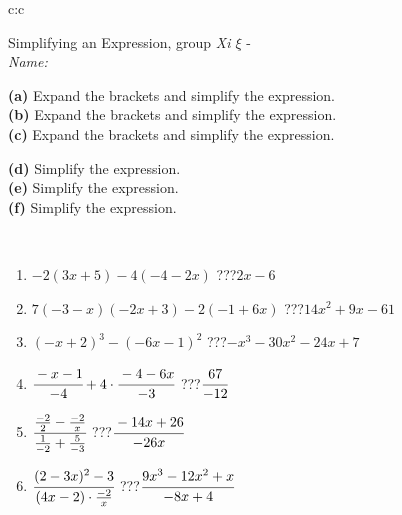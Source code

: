 \documentclass[10pt]{report}
\begin{document}
\newpage
\thispagestyle{empty}
\begin{tabular}{c:c}
\begin{minipage}[c][104.5mm][t]{0.5\linewidth}
\begin{center}
\vspace{7mm}
{\huge Simplifying an Expression, group \textit{Xi $\xi$} -}\\[5mm]
\textit{Name:}\phantom{xxxxxxxxxxxxxxxxxxxxxxxxxxxxxxxxxxxxxxxxxxxxxxxxxxxxxxxxxxxxxxxxx}\\[5mm]
\begin{minipage}{0.95\linewidth}
\begin{center}
{\small \begin{minipage}{0.6\textwidth}
\textbf{(a)} Expand the brackets and simplify the expression. \\[1mm]
\textbf{(b)} Expand the brackets and simplify the expression. \\[1mm]
\textbf{(c)} Expand the brackets and simplify the expression.
\end{minipage} \begin{minipage}{0.39\textwidth}
\textbf{(d)} Simplify the expression. \\[1mm]
\textbf{(e)} Simplify the expression. \\[1mm]
\textbf{(f)} Simplify the expression.
\end{minipage}
}
\end{center}
\end{minipage}
\\[4mm]
\begin{minipage}{0.79\linewidth}
\begin{center}
\begin{varwidth}{\linewidth}
\begin{enumerate}
\normalsize
\item $-2(3x+5)-4(-4-2x)$\quad \dotfill\; ???\;\dotfill \quad $2x-6$
\item $7(-3-x)(-2x+3)-2(-1+6x)$\quad \dotfill\; ???\;\dotfill \quad $14x^2+9x-61$
\item $(-x+2)^3-(-6x-1)^2$\quad \dotfill\; ???\;\dotfill \quad $-x^3-30x^2-24x+7$
\item $\cfrac{-x-1}{-4}+4\cdot\cfrac{-4-6x}{-3}$\quad \dotfill\; ???\;\dotfill \quad $\cfrac{67}{-12}$
\item $\cfrac{\frac{-2}{2}-\frac{-2}{x}}{\frac{1}{-2}+\frac{5}{-3}}$\quad \dotfill\; ???\;\dotfill \quad $\cfrac{-14x+26}{-26x}$
\item $\cfrac{(2-3x)^2-3}{(4x-2)\cdot\frac{-2}{x}}$\quad \dotfill\; ???\;\dotfill \quad $\cfrac{9x^3-12x^2+x}{-8x+4}$

\end{enumerate}
\end{varwidth}
\end{center}
\end{minipage}
\end{center}
\end{minipage}
\end{tabular}
\end{document}
